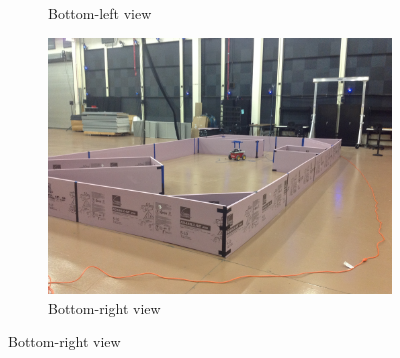 \documentclass[11pt,professionalfonts,hyperref={pdftex,pdfpagemode=none,pdfstartview=FitH}]{beamer}
\begin{document}
\begin{frame}
\begin{figure}
\begin{subfigure}[b]{0.28\textwidth}
        		\caption*{Bottom-left view}
    	\end{subfigure}
	\hspace*{0.03\textwidth}
	\begin{subfigure}[b]{0.28\textwidth}
        		\includegraphics[width=\textwidth]{test_setup_2.jpg}
        		\caption*{Bottom-right view}
    	\end{subfigure}
\end{figure}

\end{frame}


%
%
%
%
\end{document}
